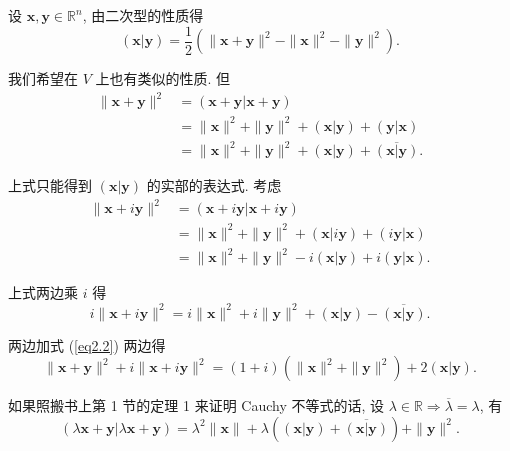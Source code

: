 \documentclass{ctexart}
\begin{document}
设 $\boldsymbol{x},\boldsymbol{y}\in\mathbb{R}^n$, 由二次型的性质得
\[(\boldsymbol{x}|\boldsymbol{y})=\dfrac{1}{2}(\|\boldsymbol{x}+\boldsymbol{y}\|^2-\|\boldsymbol{x}\|^2-\|\boldsymbol{y}\|^2).\]

我们希望在 $V$ 上也有类似的性质. 但
\begin{equation}\label{eq2.2}
    \begin{aligned}
        \|\boldsymbol{x}+\boldsymbol{y}\|^2 & =(\boldsymbol{x}+\boldsymbol{y}|\boldsymbol{x}+\boldsymbol{y}) \\
        & =\|\boldsymbol{x}\|^2+\|\boldsymbol{y}\|^2+(\boldsymbol{x}|\boldsymbol{y})+(\boldsymbol{y}|\boldsymbol{x}) \\
        & =\|\boldsymbol{x}\|^2+\|\boldsymbol{y}\|^2+(\boldsymbol{x}|\boldsymbol{y})+\overline{(\boldsymbol{x}|\boldsymbol{y})}. 
    \end{aligned}
\end{equation}

上式只能得到 $(\boldsymbol{x}|\boldsymbol{y})$ 的实部的表达式. 考虑
\begin{align*}
    \|\boldsymbol{x}+i\boldsymbol{y}\|^2 & =(\boldsymbol{x}+i\boldsymbol{y}|\boldsymbol{x}+i\boldsymbol{y}) \\
    & =\|\boldsymbol{x}\|^2+\|\boldsymbol{y}\|^2+(\boldsymbol{x}|i\boldsymbol{y})+(i\boldsymbol{y}|\boldsymbol{x}) \\
    & =\|\boldsymbol{x}\|^2+\|\boldsymbol{y}\|^2-i(\boldsymbol{x}|\boldsymbol{y})+i(\boldsymbol{y}|\boldsymbol{x}).
\end{align*}

上式两边乘 $i$ 得
\[i\|\boldsymbol{x}+i\boldsymbol{y}\|^2=i\|\boldsymbol{x}\|^2+i\|\boldsymbol{y}\|^2+(\boldsymbol{x}|\boldsymbol{y})-\overline{(\boldsymbol{x}|\boldsymbol{y})}.\]

两边加式 (\ref{eq2.2}) 两边得
\begin{equation}\label{eq2.3}
    \|\boldsymbol{x}+\boldsymbol{y}\|^2+i\|\boldsymbol{x}+i\boldsymbol{y}\|^2=(1+i)(\|\boldsymbol{x}\|^2+\|\boldsymbol{y}\|^2)+2(\boldsymbol{x}|\boldsymbol{y}).
\end{equation}

如果照搬书上第 1 节的定理 1 来证明 Cauchy 不等式的话, 设 $\lambda\in\mathbb{R}\Rightarrow\overline{\lambda}=\lambda$, 有
\[(\lambda\boldsymbol{x}+\boldsymbol{y}|\lambda\boldsymbol{x}+\boldsymbol{y})=\lambda^2\|\boldsymbol{x}\|+\lambda((\boldsymbol{x}|\boldsymbol{y})+\overline{(\boldsymbol{x}|\boldsymbol{y})})+\|\boldsymbol{y}\|^2.\]
\end{document}
